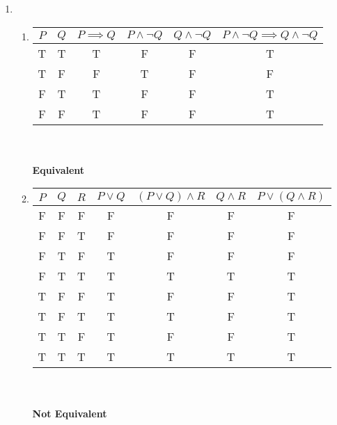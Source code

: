 \begin{enumerate}
      \item
            \begin{enumerate}[label=(\alph*), itemsep=16pt]
                  \item
                        \begin{tabular}[t]{c|c|c|c|c|c}
                              $P$ & $Q$ & $P\implies Q$ & $P \land\neg Q$ & $Q \land\neg Q$ & $P \land\neg Q \implies Q \land\neg Q$ \\
                              \hline
                              T   & T   & T             & F               & F               & T                                      \\
                              T   & F   & F             & T               & F               & F                                      \\
                              F   & T   & T             & F               & F               & T                                      \\
                              F   & F   & T             & F               & F               & T
                        \end{tabular}
                        \\\\\textbf{Equivalent}

                  \item
                        \begin{tabular}[t]{c|c|c|c|c|c|c}
                              $P$ & $Q$ & $R$ & $P \lor Q$ & $(P \lor Q) \land R$ & $Q \land R$ & $P \lor (Q \land R)$ \\
                              \hline
                              F   & F   & F   & F          & F                    & F           & F                    \\
                              F   & F   & T   & F          & F                    & F           & F                    \\
                              F   & T   & F   & T          & F                    & F           & F                    \\
                              F   & T   & T   & T          & T                    & T           & T                    \\
                              T   & F   & F   & T          & F                    & F           & T                    \\
                              T   & F   & T   & T          & T                    & F           & T                    \\
                              T   & T   & F   & T          & F                    & F           & T                    \\
                              T   & T   & T   & T          & T                    & T           & T
                        \end{tabular}
                        \\\\\textbf{Not Equivalent}


\end{enumerate}
\end{enumerate}
